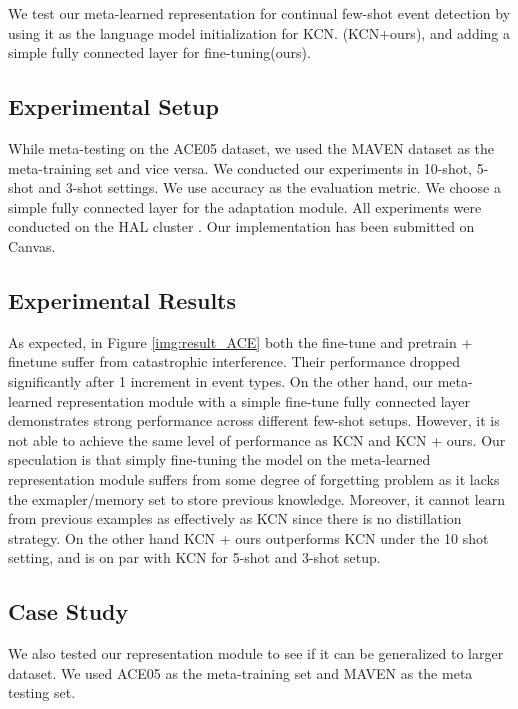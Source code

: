 We test our meta-learned representation for continual few-shot event detection by using it as the language model initialization for KCN. (KCN+ours), and adding a simple fully connected layer for fine-tuning(ours). 

\subsection{Experimental Setup}
While meta-testing on the ACE05 dataset, we used the MAVEN dataset as the meta-training set and vice versa.  We conducted our experiments in 10-shot, 5-shot and 3-shot settings.  We use accuracy as the evaluation metric. We choose a simple fully connected layer for the adaptation module.  All experiments were conducted on the HAL cluster \citep{HAL}. Our implementation has been submitted on Canvas. 

\subsection{Experimental Results}
As expected,  in Figure \ref{img:result_ACE} both the fine-tune and pretrain + finetune suffer from catastrophic interference. Their performance dropped significantly after 1 increment in event types. On the other hand, our meta-learned representation module with a simple fine-tune fully connected layer demonstrates strong performance across different few-shot setups.  However, it is not able to achieve the same level of performance as KCN and KCN + ours. Our speculation is that simply fine-tuning the model on the meta-learned representation module suffers from some degree of forgetting problem as it lacks the exmapler/memory set to store previous knowledge. Moreover, it cannot learn from previous examples as effectively as KCN since there is no distillation strategy. On the other hand KCN + ours outperforms KCN under the 10 shot setting, and is on par with KCN for 5-shot and 3-shot setup. 

\subsection{Case Study}
We also tested our representation module to see if it can be generalized to larger dataset.  We used ACE05 as the meta-training set and MAVEN as the meta testing set. 

